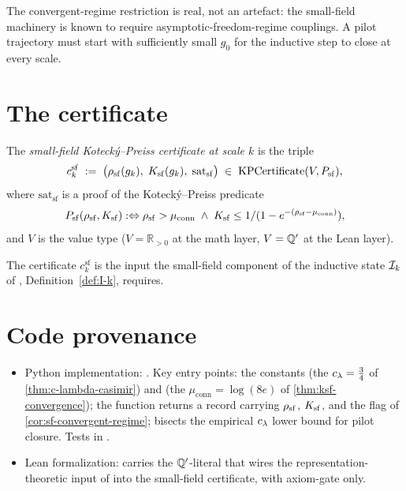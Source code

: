 The convergent-regime restriction is real, not an artefact: the
small-field machinery is known to require asymptotic-freedom-regime
couplings.  A pilot trajectory must start with sufficiently small
$g_0$ for the inductive step to close at every scale.

\section{The certificate}
\label{sec:sf-certificate}

\begin{definition}
\label{def:sf-certificate}
The \emph{small-field Kotecký--Preiss certificate at scale $k$} is
the triple
\begin{equation}
  \label{eq:sf-certificate}
  c_k^{\mathrm{sf}} \;:=\;
  \bigl(\rho_{\mathrm{sf}}(g_k),\; K_{\mathrm{sf}}(g_k),\; \mathrm{sat}_{\mathrm{sf}}\bigr)
  \;\in\; \mathrm{KPCertificate}(V, P_{\mathrm{sf}}),
\end{equation}
where $\mathrm{sat}_{\mathrm{sf}}$ is a proof of the
Kotecký--Preiss predicate
\[
  P_{\mathrm{sf}}(\rho_{\mathrm{sf}}, K_{\mathrm{sf}}) :\Leftrightarrow
  \rho_{\mathrm{sf}} > \mu_{\mathrm{conn}} \;\wedge\;
  K_{\mathrm{sf}} \le 1 / (1 - e^{-(\rho_{\mathrm{sf}} - \mu_{\mathrm{conn}})}),
\]
and $V$ is the value type ($V = \mathbb{R}_{>0}$ at the math layer,
$V = \mathbb{Q}'$ at the Lean layer).
\end{definition}

The certificate $c_k^{\mathrm{sf}}$ is the input the small-field
component of the inductive state $\mathcal{I}_k$ of
, Definition~\ref{def:I-k}, requires.

\section{Code provenance}
\label{sec:sf-codeanchor}

\begin{itemize}
  \item Python implementation:
    .  Key entry points:
    the constants 
    (the $c_\lambda = \tfrac34$ of \cref{thm:c-lambda-casimir}) and
     (the $\mu_{\mathrm{conn}} =
    \log(8e)$ of \cref{thm:ksf-convergence}); the function
     returns a 
    record carrying $\rho_{\mathrm{sf}}$, $K_{\mathrm{sf}}$, and the
     flag of \cref{cor:sf-convergent-regime};
     bisects the
    empirical $c_\lambda$ lower bound for pilot closure.
    Tests in .
  \item Lean formalization:
     carries the $\mathbb{Q}'$-literal
     that wires the
    representation-theoretic input of  into
    the small-field certificate, with axiom-gate
    \codepath{[propext]} only.
\end{itemize}

